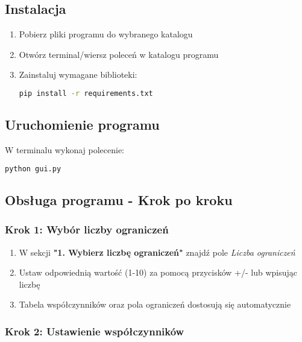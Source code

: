 \documentclass[12pt,a4paper]{article}
\begin{document}
\subsection{Instalacja}

\begin{enumerate}
    \item Pobierz pliki programu do wybranego katalogu
    \item Otwórz terminal/wiersz poleceń w katalogu programu
    \item Zainstaluj wymagane biblioteki:
    \begin{lstlisting}[language=bash]
pip install -r requirements.txt
    \end{lstlisting}
\end{enumerate}

\subsection{Uruchomienie programu}

W terminalu wykonaj polecenie:
\begin{lstlisting}[language=bash]
python gui.py
\end{lstlisting}

\subsection{Obsługa programu - Krok po kroku}

\subsubsection{Krok 1: Wybór liczby ograniczeń}

\begin{enumerate}
    \item W sekcji \textbf{"1. Wybierz liczbę ograniczeń"} znajdź pole \textit{Liczba ograniczeń}
    \item Ustaw odpowiednią wartość (1-10) za pomocą przycisków +/- lub wpisując liczbę
    \item Tabela współczynników oraz pola ograniczeń dostosują się automatycznie
\end{enumerate}

\subsubsection{Krok 2: Ustawienie współczynników}
\end{document}
